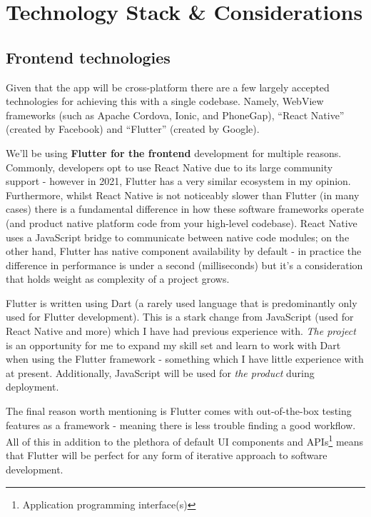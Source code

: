 \section{Technology Stack \& Considerations}
\subsection{Frontend technologies}
Given that the app will be cross-platform there are
a few largely accepted technologies for achieving this with a single codebase.
Namely, WebView frameworks (such as Apache Cordova, Ionic, and PhoneGap),
``React Native'' (created by Facebook) and ``Flutter'' (created by Google). 
\par
We'll be using \textbf{Flutter for the frontend} development for multiple reasons.
Commonly, developers opt to use React Native due to its large
community support - however in 2021, Flutter has a very similar ecosystem in my opinion.
Furthermore, whilst React Native is not noticeably slower than Flutter (in many cases) there is a fundamental
difference in how these software frameworks operate (and product native platform code from your high-level codebase).
React Native uses a JavaScript bridge to communicate between native code modules; on the other hand,
Flutter has native component availability by default - in practice the difference in performance is under
a second (milliseconds) but it's a consideration that holds weight as complexity of a project grows.
\par
Flutter is written using Dart (a rarely used language that is predominantly only used for Flutter development).
This is a stark change from JavaScript (used for React Native and more) which I have had previous experience with.
\textit{The project} is an opportunity for me to expand my skill set and learn to work with Dart when using
the Flutter framework - something which I have little experience with at present. Additionally,
JavaScript will be used for \textit{the product} during deployment.
\par
The final reason worth mentioning is Flutter comes with out-of-the-box testing features
as a framework - meaning there is less trouble finding a good workflow.
All of this in addition to the plethora of default UI components and APIs\footnote{Application programming interface(s)} means
that Flutter will be perfect for any form of iterative approach 
to software development.
\pagebreak

